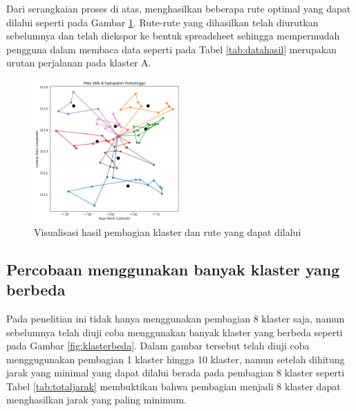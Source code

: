 Dari serangkaian proses di atas, menghasilkan beberapa rute optimal yang dapat dilalui seperti pada Gambar \ref{fig:vishasilmtsp}. Rute-rute yang dihasilkan telah diurutkan sebelumnya dan telah diekspor ke bentuk spreadsheet sehingga mempermudah pengguna dalam membaca data seperti pada Tabel \ref{tab:datahasil} merupakan urutan perjalanan pada klaster A.

\begin{figure}[H]
	\centering
	\includegraphics[width=0.5\textwidth]{Gambar/hasil mtsp.png}
	\caption{Visualisasi hasil pembagian klaster dan rute yang dapat dilalui}
	\label{fig:vishasilmtsp}
\end{figure}



\subsection{Percobaan menggunakan banyak klaster yang berbeda}

Pada penelitian ini tidak hanya menggunakan pembagian 8 klaster saja, namun sebelumnya telah diuji coba menggunakan banyak klaster yang berbeda seperti pada Gambar \ref{fig:klasterbeda}. Dalam gambar tersebut telah diuji coba menggugunakan pembagian 1 klaster hingga 10 klaster, namun setelah dihitung jarak yang minimal yang dapat dilalui berada pada pembagian 8 klaster seperti Tabel \ref{tab:totaljarak} membuktikan bahwa pembagian menjadi 8 klaster dapat menghasilkan jarak yang paling minimum.


